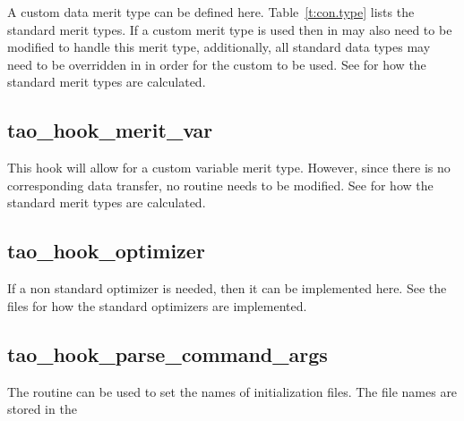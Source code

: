 {A custom data merit type can be defined here. Table~\ref{t:con.type}
lists the standard merit types. If a custom merit type is used then
 in  may also need to be
modified to handle this merit type, additionally, all standard data
types may need to be overridden in  in
order for the custom  to be used.  See
 for how the standard merit types are
calculated.

\subsection{tao_hook_merit_var}

This hook will allow for a custom variable merit type. However, since
there is no corresponding data transfer, no  routine needs
to be modified.  See  for how the standard
merit types are calculated.

\subsection{tao_hook_optimizer}

If a non standard optimizer is needed, then it can be implemented
here. See the  files for how the
standard optimizers are implemented.

\subsection{tao_hook_parse_command_args}

The  routine can be used to set the names of initialization
files. The file names are stored in the \vn{s%
following changes the default plot initialization file:
\begin{example}
  s%
\end{example}
Note that if an initialization file name is given on the command line or in the root \tao
initialization file, that name will supersede the hook name.

}}
